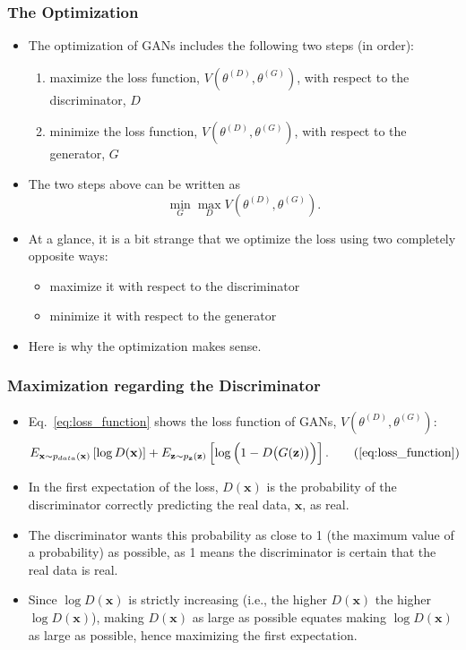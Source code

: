 \documentclass{beamer}
\begin{document}
\begin{frame}
\setlength{\leftmargini}{0.3cm}
\setlength{\leftmarginii}{0.6cm}
\setlength{\leftmarginiii}{0.9cm}
\frametitle{The Optimization}
\begin{itemize}
\item The optimization of GANs includes the following two steps (in order):
	\begin{enumerate}
	\item maximize the loss function, $V(\theta^{(D)}, \theta^{(G)})$, with respect to the discriminator, $D$
	\item minimize the loss function, $V(\theta^{(D)}, \theta^{(G)})$, with respect to the generator, $G$
	\end{enumerate}
\item The two steps above can be written as
\begin{equation}\label{eq:optimization}
\min_{G} \max_{D} V(\theta^{(D)}, \theta^{(G)}).
\end{equation}
\item At a glance, it is a bit strange that we optimize the loss using two completely opposite ways: 
	\begin{itemize}
	\item maximize it with respect to the discriminator
	\item minimize it with respect to the generator
	\end{itemize}
\item Here is why the optimization makes sense.
\end{itemize}
\end{frame}

\begin{frame}
\setlength{\leftmargini}{0.3cm}
\setlength{\leftmarginii}{0.6cm}
\setlength{\leftmarginiii}{0.9cm}
\frametitle{Maximization regarding the Discriminator}
\begin{itemize}
\item Eq.~\eqref{eq:loss_function} shows the loss function of GANs, $V(\theta^{(D)}, \theta^{(G)})$:
\begin{equation}
E_{\mathbf{x}\sim p_{data}(\mathbf{x})}\left[\log D(\mathbf{x}) \right] + E_{\mathbf{z}\sim p_{\mathbf{z}}(\mathbf{z})}\left[\log \Big(1 - D \big(G(\mathbf{z}) \big) \Big) \right].
\tag{\ref{eq:loss_function}}
\end{equation}
\item In the first expectation of the loss, $D(\mathbf{x})$ is the probability of the discriminator correctly predicting the real data, $\mathbf{x}$, as real.
\item The discriminator wants this probability as close to 1 (the maximum value of a probability) as possible, as 1 means the discriminator is certain that the real data is real.
\item Since $\log D(\mathbf{x})$ is strictly increasing (i.e., the higher $D(\mathbf{x})$ the higher $\log D(\mathbf{x})$), making $D(\mathbf{x})$ as large as possible equates making $\log D(\mathbf{x})$ as large as possible, hence maximizing the first expectation.
\end{itemize}
\end{frame}
\end{document}
